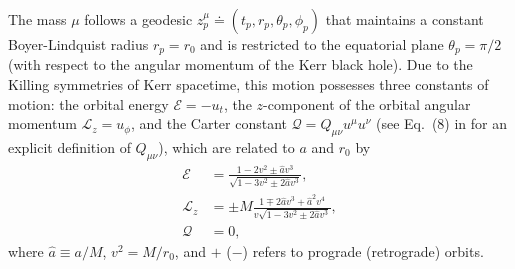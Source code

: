 \documentclass[%
 reprint,
 nofootinbib,
 amsmath,amssymb,
 aps,
 prd,
]{revtex4-2}
\begin{document}
The mass $\mu$ follows a geodesic $z_p^\mu \doteq (t_p, r_p, \theta_p, \phi_p)$ that maintains a constant Boyer-Lindquist radius $r_p = r_0$ and is restricted to the equatorial plane $\theta_p = \pi/2$ (with respect to the angular momentum of the Kerr black hole). Due to the Killing symmetries of Kerr spacetime, this motion possesses three constants of motion: the orbital energy $\mathcal{E} = -u_t$, the $z$-component of the orbital angular momentum $\mathcal{L}_z = u_\phi$, and the Carter constant $\mathcal{Q} = Q_{\mu\nu} u^\mu u^\nu$ (see Eq.~(8) in \cite{SteiWarb20} for an explicit definition of $Q_{\mu\nu}$), which are related to $a$ and $r_0$ by
\begin{subequations} \label{eqn:En}
\begin{align}
    \mathcal{E} &= \frac{1 - 2 v^2 \pm \hat{a} v^3}{\sqrt{1-3v^2\pm 2\hat{a}v^3}},
    \\
    \mathcal{L}_z &= \pm M  \frac{1 \mp 2 \hat{a} v^3 + \hat{a}^2 v^4}{v\sqrt{1-3v^2\pm 2\hat{a}v^3}},
    \\
    \mathcal{Q} &= 0,
\end{align}
\end{subequations}
where $\hat{a} \equiv a/M$, $v^2 = M/r_0$, and $+$ ($-$) refers to prograde (retrograde) orbits.
\end{document}

